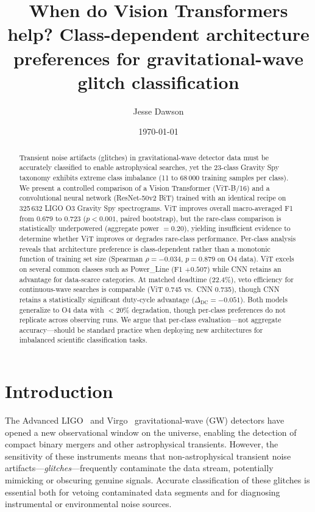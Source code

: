 \documentclass[12pt]{article}
\title{When do Vision Transformers help? Class-dependent architecture preferences for gravitational-wave glitch classification}
\author{Jesse Dawson}
\date{\today}
\newcommand{\Ntotal}{325\,632}
\newcommand{\Nclasses}{23}
\newcommand{\vitMacroF}{0.723}
\newcommand{\cnnMacroF}{0.679}
\newcommand{\spearmanRhoOfour}{-0.034}
\newcommand{\spearmanPOfour}{0.879}
\newcommand{\matchedDeadtime}{22.4\%}
\newcommand{\cwEffVit}{0.745}
\newcommand{\cwEffCnn}{0.735}
\newcommand{\deltaDC}{-0.051}
\newcommand{\powerLineDiffOthree}{+0.507}
\begin{document}
\maketitle

\begin{abstract}
Transient noise artifacts (glitches) in gravitational-wave detector data
must be accurately classified to enable astrophysical searches, yet the
\Nclasses-class Gravity Spy taxonomy exhibits extreme class imbalance
(11 to 68\,000 training samples per class).
We present a controlled comparison of a Vision Transformer (ViT-B/16) and a
convolutional neural network (ResNet-50v2 BiT) trained with an identical recipe
on \Ntotal{} LIGO O3 Gravity Spy spectrograms.
ViT improves overall macro-averaged F1 from \cnnMacroF{}
to \vitMacroF{} ($p < 0.001$, paired bootstrap), but the rare-class comparison
is statistically underpowered (aggregate power $= 0.20$), yielding
insufficient evidence to determine whether ViT improves or degrades
rare-class performance.
Per-class analysis reveals that architecture preference is
class-dependent rather than a monotonic function of training set
size (Spearman $\rho = \spearmanRhoOfour$, $p = \spearmanPOfour$ on O4 data).
ViT excels on several common classes such as Power\_Line
(F1 $\powerLineDiffOthree$) while CNN retains an advantage for
data-scarce categories.
At matched deadtime (\matchedDeadtime), veto efficiency for
continuous-wave searches is comparable
(ViT \cwEffVit{} vs.\ CNN \cwEffCnn), though CNN retains a
statistically significant duty-cycle advantage
($\Delta_\mathrm{DC} = \deltaDC$).
Both models generalize to O4 data with $<$20\% degradation, though per-class
preferences do not replicate across observing runs.
We argue that per-class evaluation---not aggregate accuracy---should be
standard practice when deploying new architectures for imbalanced scientific
classification tasks.
\end{abstract}


\section{Introduction}
\label{sec:introduction}

The Advanced LIGO~\citep{aLIGO2015} and Virgo~\citep{Virgo2015}
gravitational-wave (GW) detectors have opened a new observational window on the
universe, enabling the detection of compact binary mergers and other
astrophysical transients.
However, the sensitivity of these instruments means that non-astrophysical
transient noise artifacts---\emph{glitches}---frequently contaminate the data
stream, potentially mimicking or obscuring genuine signals.
Accurate classification of these glitches is essential both for vetoing
contaminated data segments and for diagnosing instrumental or environmental
noise sources.
\end{document}
